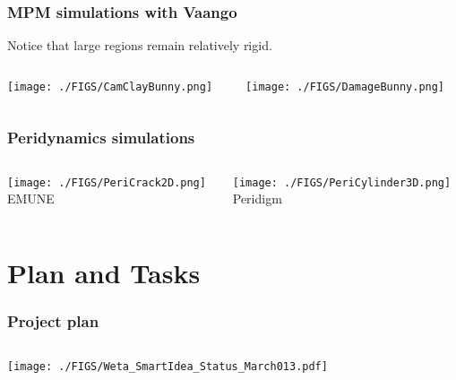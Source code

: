 \documentclass[a4paper]{beamer}
\begin{document}
    \begin{frame}
      \frametitle{MPM simulations with Vaango}
      {\Grey Notice that large regions remain relatively rigid.} 
      \begin{columns}
        \begin{column}{0.5\textwidth}
          \begin{center}
            \texttt{[image: ./FIGS/CamClayBunny.png]} 
          \end{center}
        \end{column}
        \begin{column}{0.5\textwidth}
          \begin{center}
            \texttt{[image: ./FIGS/DamageBunny.png]} 
          \end{center}
        \end{column}
      \end{columns}
    \end{frame}

    \begin{frame}
      \frametitle{Peridynamics simulations}
      \begin{columns}
        \begin{column}{0.5\textwidth}
          \begin{center}
            \texttt{[image: ./FIGS/PeriCrack2D.png]} \\
            {\Grey EMUNE}
          \end{center}
        \end{column}
        \begin{column}{0.5\textwidth}
          \begin{center}
            \texttt{[image: ./FIGS/PeriCylinder3D.png]} \\
            {\Grey Peridigm}
          \end{center}
        \end{column}
      \end{columns}
    \end{frame}

  \section{Plan and Tasks}

    \begin{frame}
      \frametitle{Project plan}
      \begin{columns}
        \begin{column}{\textwidth}
          \centering
          \texttt{[image: ./FIGS/Weta\_SmartIdea\_Status\_March013.pdf]} \\
        \end{column}
      \end{columns}
    \end{frame}
\end{document}
